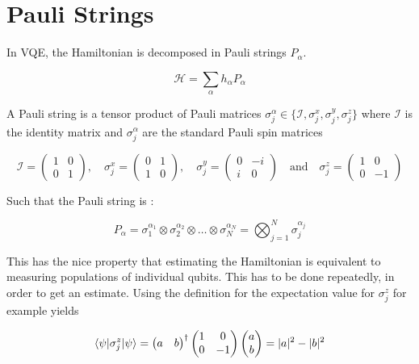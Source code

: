 \chapter{Pauli Strings}\label{ch:PauliExpectation}

In VQE, the Hamiltonian is decomposed in Pauli strings $P_{\alpha}$.

\begin{equation}
	\mathcal{H} = \sum_{\alpha} h_{\alpha} P_{\alpha}
\end{equation}


A Pauli string is a tensor product of Pauli matrices $\sigma_j^{\alpha} \in \{\mathcal{I}, \sigma_j^x, \sigma_j^y, \sigma_j^z\}$ where $\mathcal{I}$ is the identity matrix and $\sigma_j^{\alpha}$ are the standard Pauli spin matrices \cite{Griffiths2004}

\begin{equation}
	\mathcal{I} =
	 \begin{pmatrix}
		1 & 0\\
		0 & 1
	\end{pmatrix},
	 \quad \sigma_j^x=
	\begin{pmatrix}
		0 & 1\\
		1 & 0
	\end{pmatrix},
	\quad \sigma_j^y=
	\begin{pmatrix}
		0 & -i\\
		i & 0
	\end{pmatrix} 
	\quad \text{and}
	\quad \sigma_j^z = 
	\begin{pmatrix}
		1 & 0\\
		0 & -1
	\end{pmatrix}
\end{equation}

Such that the Pauli string is \cite{Moll2018}:

\begin{equation}\label{eq:PauliString}
	P_{\alpha} = 
	\sigma_1^{\alpha_1} \otimes \sigma_2^{\alpha_2} \otimes \ldots \otimes \sigma_N^{\alpha_N} = 
	\bigotimes_{j=1}^N \sigma_j^{\alpha_j}
\end{equation}

This has the nice property that estimating the Hamiltonian is equivalent to measuring populations of individual qubits. This has to be done repeatedly, in order to get an estimate. Using the definition for the expectation value for $\sigma_j^z$ for example yields

\begin{equation}\label{eq:ExpectationValue}
	\langle\psi\rvert  \sigma_j^z  \lvert\psi\rangle = 
	\begin{pmatrix}
		a & b
	\end{pmatrix}^{\dag}
	\begin{pmatrix}
		1 & 0\\
		0 & -1
	\end{pmatrix}
	\begin{pmatrix}
		a \\ b
	\end{pmatrix}=
	|a|^2-|b|^2
\end{equation}

